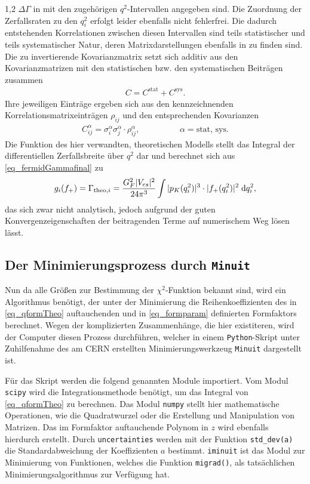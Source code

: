 \documentclass[11pt,a4paper,twoside]{report}
\begin{document}
\begin{spacing}{1,2}
 $\Delta \Gamma$ in \cite{PhysRev_Data} mit den zugehörigen $q^2$-Intervallen angegeben sind. Die 
Zuordnung der Zerfallsraten zu den $q^2_i$ erfolgt leider ebenfalls nicht fehlerfrei. Die dadurch entstehenden Korrelationen zwischen diesen Intervallen 
sind teils statistischer und teils systematischer Natur, deren Matrixdarstellungen ebenfalls in \cite{PhysRev_Data} zu finden 
sind. Die zu invertierende Kovarianzmatrix setzt sich additiv aus den Kovarianzmatrizen mit den statistischen bzw. den systematischen Beiträgen zusammen
\begin{align}
 C = C^{\text{stat}} + C^{\text{sys}}.
\end{align}
Ihre jeweiligen Einträge ergeben sich aus den kennzeichnenden Korrelationsmatrixeinträgen $\rho_{ij}$ und den entsprechenden Kovarianzen
\begin{align}
 C^{\alpha}_{ij} = \sigma^{\alpha}_i \sigma^{\alpha}_j \cdot \rho^{\alpha}_{ij}, \hspace{2cm}\alpha = \text{stat, sys}.
\end{align}
Die Funktion des hier verwandten, theoretischen Modells stellt das Integral der differentiellen Zerfallsbreite über $q^2$ dar und berechnet sich aus 
\eqref{eq_fermidGammafinal} zu
\begin{align}
 g_i(f_+) = \Gamma_{\text{theo},i} = \frac{G_F^2 |V_{cs}|^2}{24\pi^3}\int|p_K(q_i^2)|^3 \cdot |f_+(q^2_i)|^2\; \mathrm{d} q_i^2,
 \label{eq_qformTheo}
\end{align}
das sich zwar nicht analytisch, jedoch aufgrund der guten Konvergenzeigenschaften der beitragenden Terme auf numerischem Weg lösen lässt. 

\subsection{Der Minimierungsprozess durch \texttt{Minuit}}
Nun da alle Größen zur Bestimmung der $\chi^2$-Funktion bekannt sind, wird ein Algorithmus benötigt, der unter der Minimierung die Reihenkoeffizienten
des in \eqref{eq_qformTheo} auftauchenden und in \eqref{eq_formparam} definierten Formfaktors berechnet. Wegen der komplizierten Zusammenhänge, die hier
existiteren, wird der Computer diesen Prozess durchführen, welcher in einem \texttt{Python}-Skript unter Zuhilfenahme des am CERN erstellten 
Minimierungswerkzeug \texttt{Minuit} dargestellt ist. 

Für das Skript werden die folgend genannten Module importiert.
Vom Modul \texttt{scipy} wird die Integrationsmethode benötigt, um das Integral von \eqref{eq_qformTheo} zu berechnen. 
Das Modul \texttt{numpy} stellt hier
mathematische Operationen, wie die Quadratwurzel oder die Erstellung und Manipulation von Matrizen. Das im Formfaktor auftauchende Polynom in $z$ wird
ebenfalls hierdurch erstellt. Durch \texttt{uncertainties} werden mit der Funktion \texttt{std\_dev(a)} die Standardabweichung der Koeffizienten $a$ bestimmt.
\texttt{iminuit} ist das Modul zur Minimierung von Funktionen, welches die Funktion \texttt{migrad()}, als tatsächlichen
Minimierungsalgorithmus zur Verfügung hat. 


\end{spacing}
\end{document}
